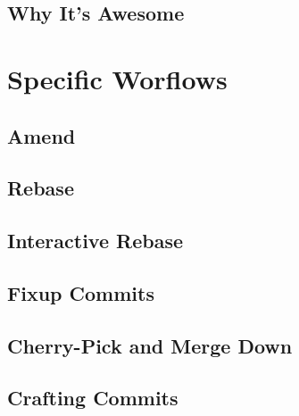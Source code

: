 \documentclass{beamer}
\begin{document}
\subsection{Why It's Awesome}

\section{Specific Worflows}

\subsection{Amend}

\subsection{Rebase}

\subsection{Interactive Rebase}

\subsection{Fixup Commits}

\subsection{Cherry-Pick and Merge Down}

\subsection{Crafting Commits}
\end{document}
